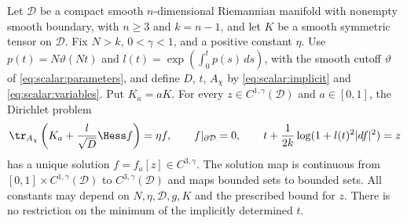 \begin{lemma}\label{lem:elliptic:trial-trace}
Let $\mathcal D$ be a compact smooth $n$-dimensional Riemannian
manifold with nonempty smooth boundary, with $n\ge3$ and $k=n-1$,
and let $K$ be a smooth symmetric tensor on $\mathcal D$.
Fix $N>k$, $0<\gamma<1$, and a positive constant $\eta$.
Use $p(t)=N\vartheta(Nt)$ and
$l(t)=\exp(\int_0^t p(s)\,ds)$, with the smooth cutoff
$\vartheta$ of \eqref{eq:scalar:parameters}, and define
$D$, $t$, $A_\chi$ by \eqref{eq:scalar:implicit} and
\eqref{eq:scalar:variables}.  Put $K_a=aK$.
For every $z\in C^{1,\gamma}(\mathcal D)$ and $a\in[0,1]$,
the Dirichlet problem
\[
 \tr_{A_\chi}\left(K_a+\frac l{\sqrt D}\Hess f\right)=\eta f,
 \qquad f|_{\partial\mathcal D}=0,
 \qquad t+\frac1{2k}\log(1+l(t)^2|df|^2)=z
\]
has a unique solution $f=f_a[z]\in C^{3,\gamma}$.
The solution map is continuous from
$[0,1]\times C^{1,\gamma}(\mathcal D)$ to
$C^{3,\gamma}(\mathcal D)$ and maps bounded sets to bounded sets.
All constants may depend on $N,\eta,\mathcal D,g,K$ and the
prescribed bound for $z$.  There is no restriction on the minimum
of the implicitly determined $t$.
\end{lemma}

